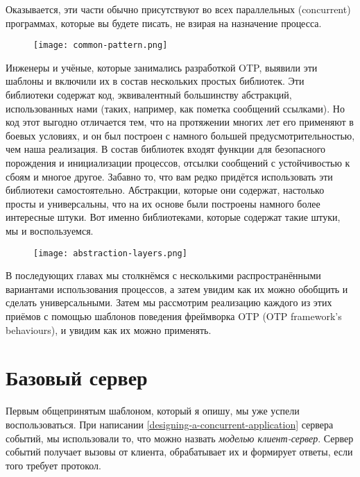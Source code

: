 Оказывается, эти части обычно присутствуют во всех параллельных (concurrent) программах, которые вы будете писать, не взирая на назначение процесса.
\begin{figure}[h!]
    \centering
    \texttt{[image: common-pattern.png]}
\end{figure}

Инженеры и учёные, которые занимались разработкой OTP, выявили эти шаблоны и включили их в состав нескольких простых библиотек.
Эти библиотеки содержат код, эквивалентный большинству абстракций, использованных нами (таких, например, как пометка сообщений ссылками).
Но код этот выгодно отличается тем, что на протяжении многих лет его применяют в боевых условиях, и он был построен с намного большей предусмотрительностью, чем наша реализация.
В состав библиотек входят функции для безопасного порождения и инициализации процессов, отсылки сообщений с устойчивостью к сбоям и многое другое.
Забавно то, что вам редко придётся использовать эти библиотеки самостоятельно.
Абстракции, которые они содержат, настолько просты и универсальны, что на их основе были построены намного более интересные штуки.
Вот именно библиотеками, которые содержат такие штуки, мы и воспользуемся.
\begin{figure}[h!]
    \centering
    \texttt{[image: abstraction-layers.png]}
\end{figure}
В последующих главах мы столкнёмся с несколькими распространёнными вариантами использования процессов, а затем увидим как их можно обобщить и сделать универсальными.
Затем мы рассмотрим реализацию каждого из этих приёмов с помощью шаблонов поведения фреймворка OTP (OTP framework's behaviours), и увидим как их можно применять.
\section{Базовый сервер}
\label{the-basic-server}
Первым общепринятым шаблоном, который я опишу, мы уже успели воспользоваться.
При написании \ref{designing-a-concurrent-application} сервера событий, мы использовали то, что можно назвать \emph{моделью клиент\--сервер}.
Сервер событий получает вызовы от клиента, обрабатывает их и формирует ответы, если того требует протокол.

